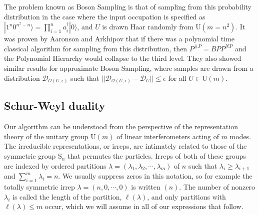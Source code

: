 The problem known as Boson Sampling is that of sampling from this probability distribution in the case where the input occupation is specified as $|1^n 0^{n^2 - n}\rangle = \prod_{i = 1}^n a_{i}^\dagger|0\rangle$, and $U$ is drawn Haar randomly from U$(m=n^2)$\cite{aaronson2011}. 
It was proven by Aaronson and Arkhipov that if there was a polynomial time classical algorithm for sampling from this distribution, then $P^{\#P} = BPP^{NP}$ and the Polynomial Hierarchy would collapse to the third level. 
They also showed similar results for approximate Boson Sampling, where samples are drawn from a distribution $\mathcal{D}_{\mathcal{O}(U, \epsilon)}$ such that $||\mathcal{D}_{\mathcal{O}(U, \epsilon)} - \mathcal{D}_U|| \leq \epsilon$ for all $U \in \textrm{U}(m)$. 


\subsection{Schur-Weyl duality}

Our algorithm can be understood from the perspective of the representation theory of the unitary group U$(m)$ of linear interferometers acting of $m$ modes.
The irreducible representations, or irreps, are intimately related to those of the symmetric group $\textrm{S}_n$ that permutes the particles.
Irreps of both of these groups are indexed by ordered partitions $\lambda = (\lambda_1,\lambda_2,\cdots,\lambda_m)$ of $n$ such that $\lambda_i \geq \lambda_{i+1}$ and $\sum_{i = 1}^m \lambda_i = n$.
We usually suppress zeros in this notation, so for example the totally symmetric irrep $\lambda=(n, 0,\cdots,0)$ is written $(n)$. 
The number of nonzero $\lambda_i$ is called the length of the partition, $\ell(\lambda)$, and only partitions with $\ell(\lambda) \leq m$ occur, which we will assume in all of our expressions that follow.

